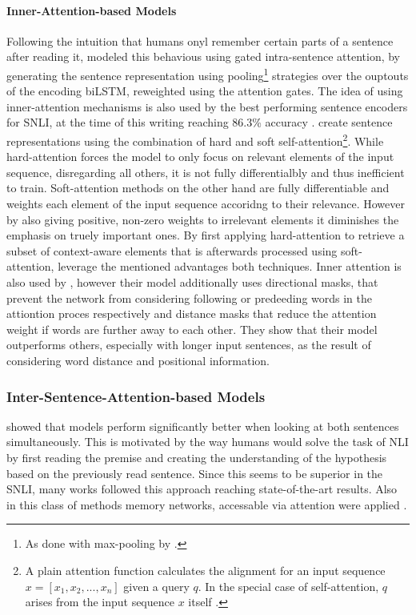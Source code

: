 \paragraph*{Inner-Attention-based Models}
Following the intuition that humans onyl remember certain parts of a sentence after reading it, \cite{chen2017recurrent} modeled this behavious using gated intra-sentence attention, by generating the sentence representation using pooling\footnote{As done with max-pooling by \cite{nie2017shortcut}.} strategies over the ouptouts of the encoding \ac{biLSTM}, reweighted using the attention gates. The idea of using inner-attention mechanisms is also used by the best performing sentence encoders for \ac{SNLI}, at the time of this writing reaching 86.3\% accuracy \citep{shen2018reinforced,im2017distance}. \cite{shen2018reinforced} create sentence representations using the combination of hard and soft self-attention\footnote{A plain attention function calculates the alignment for an input sequence $x=[x_1, x_2, ...,x_n]$ given a query $q$. In the special case of self-attention, $q$ arises from the input sequence $x$ itself \citep{shen2018reinforced}.}. While hard-attention forces the model to only focus on relevant elements of the input sequence, disregarding all others, it is not fully differentialbly and thus inefficient to train. Soft-attention methods on the other hand are fully differentiable and weights each element of the input sequence accoridng to their relevance. However by also giving positive, non-zero weights to irrelevant elements it diminishes the emphasis on truely important ones. By first applying hard-attention to retrieve a subset of context-aware elements that is afterwards processed using soft-attention, \cite{shen2018reinforced} leverage the mentioned advantages both techniques. Inner attention is also used by \cite{im2017distance}, however their model additionally uses directional masks, that prevent the network from considering following or predeeding words in the attiontion proces respectively and distance masks that reduce the attention weight if words are further away to each other. They show that their model outperforms others, especially with longer input sentences, as the result of considering word distance and positional information.

\subsubsection{Inter-Sentence-Attention-based Models}\label{sec:rel_work_sentence_encoding_models}
\cite{rocktaschel2015reasoning} showed that models perform significantly better when looking at both sentences simultaneously. This is motivated by the way humans would solve the task of \ac{NLI} by first reading the premise and creating the understanding of the hypothesis based on the previously read sentence. Since this seems to be superior in the \ac{SNLI}, many works followed this approach reaching state-of-the-art results. Also in this class of methods memory networks, accessable via attention were applied \citep{cheng2016long}.

